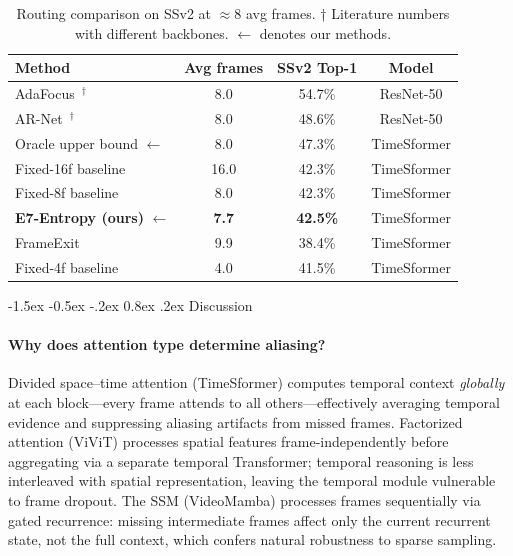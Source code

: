 \documentclass[runningheads]{llncs}
\makeatletter
\renewcommand\section{\@startsection{section}{1}{\z@}%
                       {-1.5ex \@plus -0.5ex \@minus -.2ex}%
                       {0.8ex \@plus .2ex}%
                       {\normalfont\large\bfseries\boldmath}}
\newcommand{\tabtight}{\setlength{\tabcolsep}{3.5pt}\renewcommand{\arraystretch}{1.12}}
\makeatother
\begin{document}
\begin{table}[t]
\centering
\caption{Routing comparison on SSv2 at $\approx$8 avg frames.
  † Literature numbers with different backbones.
  $\leftarrow$ denotes our methods.}
\label{tab:routing}
\scriptsize\tabtight
\begin{tabular}{l c c c}
\toprule
Method & Avg frames & SSv2 Top-1 & Model \\
\midrule
AdaFocus~\cite{wang2021adafocus}$^\dagger$ & 8.0 & 54.7\% & ResNet-50 \\
AR-Net~\cite{meng2020arnet}$^\dagger$      & 8.0 & 48.6\% & ResNet-50 \\
\midrule
Oracle upper bound $\leftarrow$  & 8.0 & 47.3\% & TimeSformer \\
Fixed-16f baseline               & 16.0 & 42.3\% & TimeSformer \\
Fixed-8f baseline                & 8.0  & 42.3\% & TimeSformer \\
\textbf{E7-Entropy (ours)} $\leftarrow$ & \textbf{7.7} & \textbf{42.5\%} & TimeSformer \\
FrameExit~\cite{ghodrati2021frameexit}  & 9.9  & 38.4\% & TimeSformer \\
Fixed-4f baseline                & 4.0  & 41.5\% & TimeSformer \\
\bottomrule
\end{tabular}
\end{table}

\section{Discussion}
\label{sec:discussion}

\paragraph{Why does attention type determine aliasing?}
Divided space--time attention (TimeSformer) computes temporal context
\emph{globally} at each block—every frame attends to all others—effectively
averaging temporal evidence and suppressing aliasing artifacts from missed frames.
Factorized attention (ViViT) processes spatial features frame-independently before
aggregating via a separate temporal Transformer; temporal reasoning is less
interleaved with spatial representation, leaving the temporal module vulnerable
to frame dropout.
The SSM (VideoMamba) processes frames sequentially via gated recurrence: missing
intermediate frames affect only the current recurrent state, not the full context,
which confers natural robustness to sparse sampling.
\end{document}

